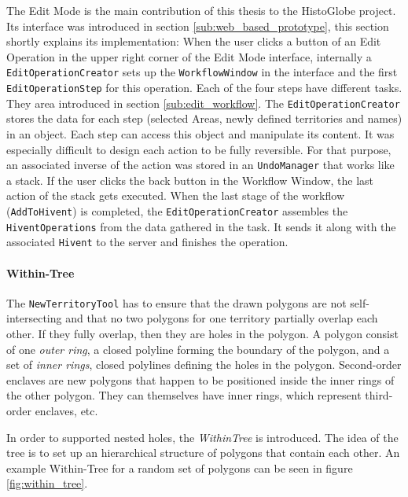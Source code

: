 The Edit Mode is the main contribution of this thesis to the HistoGlobe project. Its interface was introduced in section \ref{sub:web_based_prototype}, this section shortly explains its implementation: When the user clicks a button of an Edit Operation in the upper right corner of the Edit Mode interface, internally a \texttt{EditOperationCreator} sets up the \texttt{WorkflowWindow} in the interface and the first \texttt{EditOperationStep} for this operation. Each of the four steps have different tasks. They area introduced in section \ref{sub:edit_workflow}. The \texttt{EditOperationCreator} stores the data for each step (selected Areas, newly defined territories and names) in an object. Each step can access this object and manipulate its content. It was especially difficult to design each action to be fully reversible. For that purpose, an associated inverse of the action was stored in an \texttt{UndoManager} that works like a stack. If the user clicks the back button in the Workflow Window, the last action of the stack gets executed. When the last stage of the workflow (\texttt{AddToHivent}) is completed, the \texttt{EditOperationCreator} assembles the \texttt{HiventOperations} from the data gathered in the task. It sends it along with the associated \texttt{Hivent} to the server and finishes the operation.


\paragraph{Within-Tree} %
\label{par:within_tree}

The \texttt{NewTerritoryTool} has to ensure that the drawn polygons are not self-intersecting and that no two polygons for one territory partially overlap each other. If they fully overlap, then they are holes in the polygon. A polygon consist of one \emph{outer ring}, a closed polyline forming the boundary of the polygon, and a set of \emph{inner rings}, closed polylines defining the holes in the polygon. Second-order enclaves are new polygons that happen to be positioned inside the inner rings of the other polygon. They can themselves have inner rings, which represent third-order enclaves, etc.

In order to supported nested holes, the \emph{WithinTree} is introduced. The idea of the tree is to set up an hierarchical structure of polygons that contain each other. An example Within-Tree for a random set of polygons can be seen in figure \ref{fig:within_tree}.

